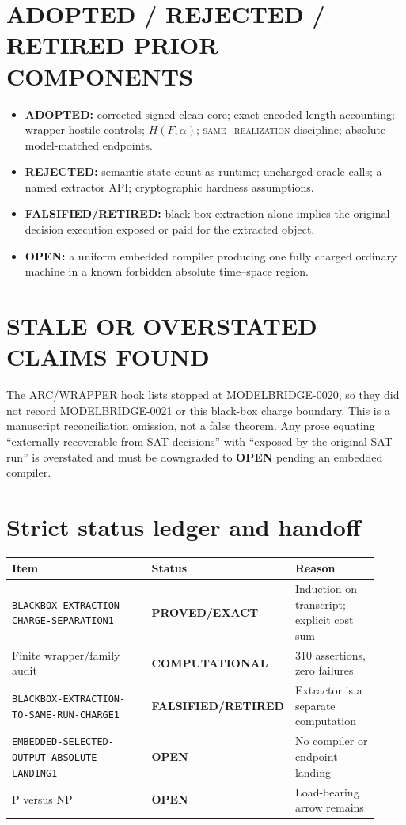 \documentclass[11pt]{article}
\newcommand{\EXACT}{\textbf{PROVED/EXACT}}
\newcommand{\COMP}{\textbf{COMPUTATIONAL}}
\newcommand{\OPEN}{\textbf{OPEN}}
\newcommand{\RETIRED}{\textbf{FALSIFIED/RETIRED}}
\newcommand{\same}{\textsc{same\_realization}}
\begin{document}
\section{ADOPTED / REJECTED / RETIRED PRIOR COMPONENTS}
\begin{itemize}[leftmargin=*]
\item \textbf{ADOPTED:} corrected signed clean core; exact encoded-length
accounting; wrapper hostile controls; $H(F,\alpha)$; \same{} discipline;
absolute model-matched endpoints.
\item \textbf{REJECTED:} semantic-state count as runtime; uncharged oracle
calls; a named extractor API; cryptographic hardness assumptions.
\item \textbf{FALSIFIED/RETIRED:} black-box extraction alone implies the
original decision execution exposed or paid for the extracted object.
\item \textbf{OPEN:} a uniform embedded compiler producing one fully charged
ordinary machine in a known forbidden absolute time--space region.
\end{itemize}

\section{STALE OR OVERSTATED CLAIMS FOUND}
The ARC/WRAPPER hook lists stopped at MODELBRIDGE-0020, so they did not record
MODELBRIDGE-0021 or this black-box charge boundary.  This is a manuscript
reconciliation omission, not a false theorem.  Any prose equating
``externally recoverable from SAT decisions'' with ``exposed by the original
SAT run'' is overstated and must be downgraded to \OPEN{} pending an embedded
compiler.

\section{Strict status ledger and handoff}
\begin{center}
\begin{tabular}{p{0.48\linewidth}p{0.19\linewidth}p{0.25\linewidth}}
\toprule
Item & Status & Reason \\
\midrule
\texttt{BLACKBOX-EXTRACTION-CHARGE-SEPARATION1} & \EXACT & Induction on transcript; explicit cost sum\\
Finite wrapper/family audit & \COMP & 310 assertions, zero failures\\
\texttt{BLACKBOX-EXTRACTION-TO-SAME-RUN-CHARGE1} & \RETIRED & Extractor is a separate computation\\
\texttt{EMBEDDED-SELECTED-OUTPUT-ABSOLUTE-LANDING1} & \OPEN & No compiler or endpoint landing\\
P versus NP & \OPEN & Load-bearing arrow remains\\
\bottomrule
\end{tabular}
\end{center}
\end{document}

